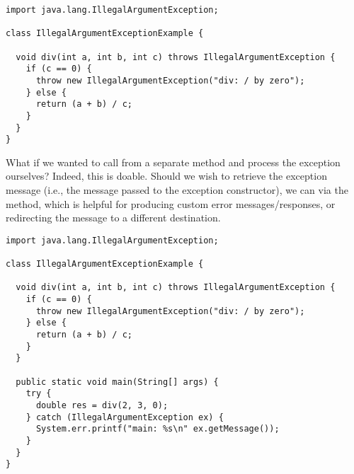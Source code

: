 \begin{lstlisting}[language=MyJava]
import java.lang.IllegalArgumentException;

class IllegalArgumentExceptionExample {
  
  void div(int a, int b, int c) throws IllegalArgumentException {
    if (c == 0) { 
      throw new IllegalArgumentException("div: / by zero"); 
    } else { 
      return (a + b) / c; 
    }
  }
}
\end{lstlisting}

What if we wanted to call  from a separate method and process the exception ourselves? Indeed, this is doable. Should we wish to retrieve the exception message (i.e., the message passed to the exception constructor), we can via the  method, which is helpful for producing custom error messages/responses, or redirecting the message to a different destination.

\begin{lstlisting}[language=MyJava]
import java.lang.IllegalArgumentException;

class IllegalArgumentExceptionExample {
  
  void div(int a, int b, int c) throws IllegalArgumentException {
    if (c == 0) { 
      throw new IllegalArgumentException("div: / by zero"); 
    } else { 
      return (a + b) / c; 
    }
  }

  public static void main(String[] args) {
    try {
      double res = div(2, 3, 0);
    } catch (IllegalArgumentException ex) {
      System.err.printf("main: %s\n" ex.getMessage());
    }
  }
}
\end{lstlisting}


